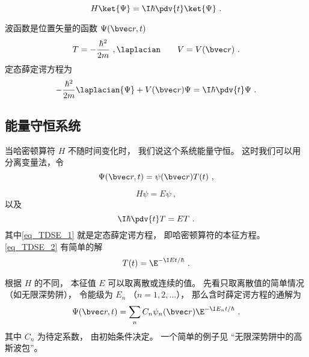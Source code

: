 
\begin{issues}
\issueDraft
\issueAbstract
{}
\end{issues}


\begin{equation}
H \ket{\Psi} = \I\hbar \pdv{t} \ket{\Psi}~.
\end{equation}


波函数是位置矢量的函数 $\Psi(\bvec r, t)$
\begin{equation}
T = -\frac{\hbar^2}{2m}~, \laplacian \qquad V = V(\bvec r)~.
\end{equation}
定态薛定谔方程为
\begin{equation}
-\frac{\hbar^2}{2m} \laplacian {\Psi} + V(\bvec r)\Psi = \I\hbar \pdv{t} \Psi~.
\end{equation}

\subsection{能量守恒系统}
当哈密顿算符 $H$ 不随时间变化时， 我们说这个系统能量守恒。 这时我们可以用分离变量法，令
\begin{equation}
\Psi(\bvec r, t) = \psi(\bvec r) T(t)~,
\end{equation}
 
\begin{equation}\label{eq_TDSE_1}
H\psi = E\psi~,
\end{equation}
以及
\begin{equation}\label{eq_TDSE_2}
\I \hbar\pdv{t}T = ET~.
\end{equation}
其中\autoref{eq_TDSE_1} 就是定态薛定谔方程， 即哈密顿算符的本征方程。 \autoref{eq_TDSE_2} 有简单的解
\begin{equation}
T(t) = \E^{-\I E t/\hbar}~.
\end{equation}

根据 $H$ 的不同， 本征值 $E$ 可以取离散或连续的值。 先看只取离散值的简单情况（如无限深势阱）， 令能级为 $E_n$ （$n = 1, 2, \dots$）， 那么含时薛定谔方程的通解为
\begin{equation}\label{eq_TDSE_5}
\Psi(\bvec r, t) = \sum_n C_n \psi_n(\bvec r) \E^{-\I E_n t/\hbar}~.
\end{equation}
其中 $C_n$ 为待定系数， 由初始条件决定。 一个简单的例子见 “无限深势阱中的高斯波包”。


